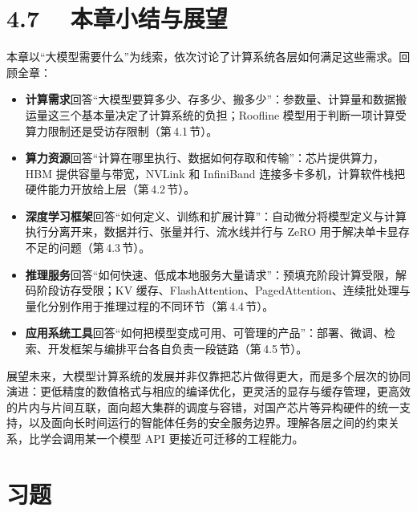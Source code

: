 \documentclass{article}
\begin{document}
\section*{4.7　 本章小结与展望}


本章以“大模型需要什么”为线索，依次讨论了计算系统各层如何满足这些需求。回顾全章：
\begin{itemize}
  \item \textbf{计算需求}回答“大模型要算多少、存多少、搬多少”：参数量、计算量和数据搬运量这三个基本量决定了计算系统的负担；Roofline 模型用于判断一项计算受算力限制还是受访存限制（第\,4.1\,节）。
  \item \textbf{算力资源}回答“计算在哪里执行、数据如何存取和传输”：芯片提供算力，HBM 提供容量与带宽，NVLink 和 InfiniBand 连接多卡多机，计算软件栈把硬件能力开放给上层（第\,4.2\,节）。
  \item \textbf{深度学习框架}回答“如何定义、训练和扩展计算”：自动微分将模型定义与计算执行分离开来，数据并行、张量并行、流水线并行与 ZeRO 用于解决单卡显存不足的问题（第\,4.3\,节）。
  \item \textbf{推理服务}回答“如何快速、低成本地服务大量请求”：预填充阶段计算受限，解码阶段访存受限；KV 缓存、FlashAttention、PagedAttention、连续批处理与量化分别作用于推理过程的不同环节（第\,4.4\,节）。
  \item \textbf{应用系统工具}回答“如何把模型变成可用、可管理的产品”：部署、微调、检索、开发框架与编排平台各自负责一段链路（第\,4.5\,节）。
\end{itemize}

展望未来，大模型计算系统的发展并非仅靠把芯片做得更大，而是多个层次的协同演进：更低精度的数值格式与相应的编译优化，更灵活的显存与缓存管理，更高效的片内与片间互联，面向超大集群的调度与容错，对国产芯片等异构硬件的统一支持，以及面向长时间运行的智能体任务的安全服务边界。理解各层之间的约束关系，比学会调用某一个模型 API 更接近可迁移的工程能力。

\section*{习题}
\end{document}
